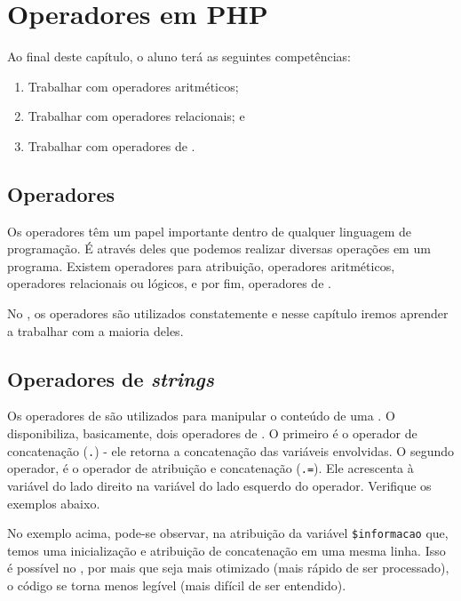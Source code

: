 \chapter{Operadores em PHP}

Ao final deste capítulo, o aluno terá as seguintes competências:
\begin{enumerate}
    \item Trabalhar com operadores aritméticos; 
    \item Trabalhar com operadores relacionais; e
    \item Trabalhar com operadores de \tipostring.
\end{enumerate}

\section{Operadores}
\label{operadores}

Os operadores têm um papel importante dentro de qualquer linguagem de programação.
É através deles que podemos realizar diversas operações em um programa. Existem
operadores para atribuição, operadores aritméticos, operadores relacionais ou lógicos,
e por fim, operadores de \tipostring.

No \php, os operadores são utilizados constatemente e nesse capítulo iremos
aprender a trabalhar com a maioria deles.

\section{Operadores de \textit{strings}}
\label{operadores-de-strings}
Os operadores de \tipostrings são utilizados para manipular o conteúdo de uma \tipostring.
O \php~ disponibiliza, basicamente, dois operadores de \tipostrings. O primeiro é o operador
de concatenação (\texttt{.}) - ele retorna a concatenação das variáveis envolvidas.
O segundo operador, é o operador de atribuição e concatenação (\texttt{.=}). Ele acrescenta
à variável do lado direito na variável do lado esquerdo do operador. Verifique os exemplos
abaixo.



No exemplo acima, pode-se observar, na atribuição da variável \texttt{\$informacao} que, 
temos uma inicialização e atribuição de concatenação em uma mesma linha. Isso é possível
no \php, por mais que seja mais otimizado (mais rápido de ser processado), o código se
torna menos legível (mais difícil de ser entendido).

